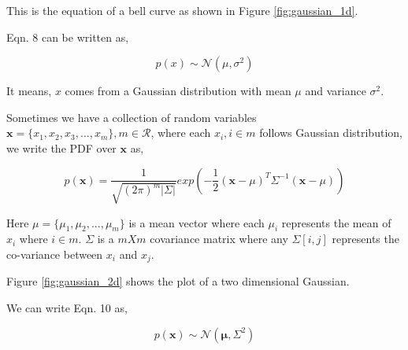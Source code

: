 \documentclass[english]{tktltiki}
\begin{document}
This is the equation of a bell curve as shown in Figure \ref{fig:gaussian_1d}.

Eqn. 8 can be written as,

\begin{equation}
p(x) \sim \mathcal{N}(\mu, \sigma^2)
\end{equation}

It means, $x$ comes from a Gaussian distribution with mean $\mu$ and variance $\sigma^2$.

Sometimes we have a collection of random variables $\mathbf{x} = \{x_1, x_2, x_3, ..., x_m\}, m \in \mathcal{R}$, where each $x_i, i \in m$ follows Gaussian distribution, we write the PDF over $\mathbf{x}$ as,

\begin{equation}
p(\mathbf{x}) = \frac{1}{\sqrt{(2 \pi)^m |\Sigma|}}exp(-\frac{1}{2}(\mathbf{x} - \mu)^T \Sigma^{-1} (\mathbf{x} - \mu))
\end{equation}

Here $\mu = \{\mu_1, \mu_2, ..., \mu_m\}$ is a mean vector where each $\mu_i$ represents the mean of $x_i$ where $i \in m$. $\Sigma$ is a $mXm$ covariance matrix where any $\Sigma[i, j]$ represents the co-variance between $x_i$ and $x_j$.

Figure \ref{fig:gaussian_2d} shows the plot of a two dimensional Gaussian.

We can write Eqn. 10 as,

\begin{equation}
p(\mathbf{x}) \sim \mathcal{N}(\mathbf{\mu}, \Sigma^2)
\end{equation}
\end{document}
